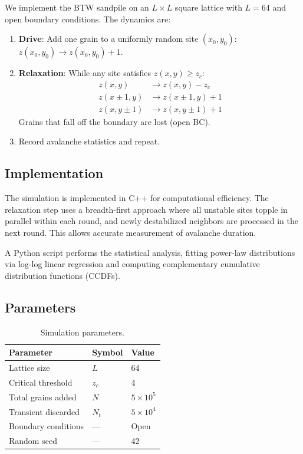 \documentclass[12pt,a4paper]{article}
\begin{document}
We implement the BTW sandpile on an $L \times L$ square lattice with
$L = 64$ and open boundary conditions. The dynamics are:
\begin{enumerate}
    \item \textbf{Drive}: Add one grain to a uniformly random site
          $(x_0, y_0)$: $z(x_0, y_0) \to z(x_0, y_0) + 1$.
    \item \textbf{Relaxation}: While any site satisfies $z(x,y) \geq z_c$:
    \begin{align}
        z(x,y) &\to z(x,y) - z_c \\
        z(x \pm 1, y) &\to z(x \pm 1, y) + 1 \\
        z(x, y \pm 1) &\to z(x, y \pm 1) + 1
    \end{align}
    Grains that fall off the boundary are lost (open BC).
    \item Record avalanche statistics and repeat.
\end{enumerate}

\subsection{Implementation}

The simulation is implemented in C++ for computational efficiency. The
relaxation step uses a breadth-first approach where all unstable sites
topple in parallel within each round, and newly destabilized neighbors
are processed in the next round. This allows accurate measurement of
avalanche duration.

A Python script performs the statistical analysis, fitting power-law
distributions via log-log linear regression and computing complementary
cumulative distribution functions (CCDFs).

\subsection{Parameters}

\begin{table}[H]
\centering
\caption{Simulation parameters.}
\begin{tabular}{lll}
\toprule
Parameter & Symbol & Value \\
\midrule
Lattice size & $L$ & 64 \\
Critical threshold & $z_c$ & 4 \\
Total grains added & $N$ & $5 \times 10^5$ \\
Transient discarded & $N_t$ & $5 \times 10^4$ \\
Boundary conditions & --- & Open \\
Random seed & --- & 42 \\
\bottomrule
\end{tabular}
\end{table}
\end{document}
